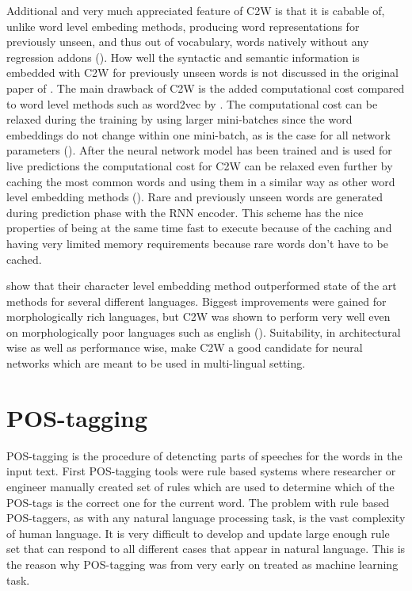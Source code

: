 \documentclass[12pt,a4paper,english
]{tutthesis}
\begin{document}
Additional and very much appreciated feature of C2W is that it is cabable of, unlike word level embeding methods, producing word representations for previously unseen, and thus out of vocabulary, words natively without any regression addons (\cite{Ling2015}). How well the syntactic and semantic information is embedded with C2W for previously unseen words is not discussed in the original paper of \cite{Ling2015}. The main drawback of C2W is the added computational cost compared to word level methods such as word2vec by \cite{Mikolov2013}. The computational cost can be relaxed during the training by using larger mini-batches since the word embeddings do not change within one mini-batch, as is the case for all network parameters (\cite{Ling2015}). After the neural network model has been trained and is used for live predictions the computational cost for C2W can be relaxed even further by caching the most common words and using them in a similar way as other word level embedding methods (\cite{Ling2015}). Rare and previously unseen words are generated during prediction phase with the RNN encoder. This scheme has the nice properties of being at the same time fast to execute because of the caching and having very limited memory requirements because rare words don't have to be cached.

\cite{Ling2015} show that their character level embedding method outperformed state of the art methods for several different languages. Biggest improvements were gained for morphologically rich languages, but C2W was shown to perform very well even on morphologically poor languages such as english (\cite{Ling2015}). Suitability, in architectural wise as well as performance wise, make C2W a good candidate for  neural networks which are meant to be used in multi-lingual setting.

\section{POS-tagging}
POS-tagging is the procedure of detencting parts of speeches for the words in the input text. First POS-tagging tools were rule based systems where researcher or engineer manually created set of rules which are used to determine which of the POS-tags is the correct one for the current word. The problem with rule based POS-taggers, as with any natural language processing task, is the vast complexity of human language. It is very difficult to develop and update large enough rule set that can respond to all different cases that appear in natural language. This is the reason why POS-tagging was from very early on treated as machine learning task.
\end{document}
